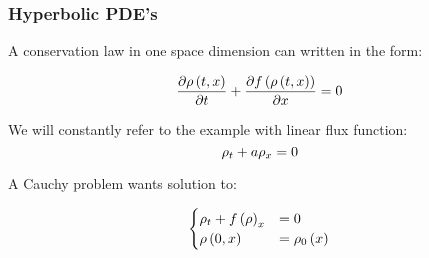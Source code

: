 \begin{frame}
\frametitle{Hyperbolic PDE's}
A conservation law in one space dimension can written in the form:


\begin{equation}
\frac{\partial\rho\left(t,x\right)}{\partial t}+\frac{\partial f\left(\rho\left(t,x\right)\right)}{\partial x}=0
\end{equation}


\begin{example}
We will constantly refer to the example with linear flux function:
\begin{equation}
\rho_{t}+a\rho_x  =0
\end{equation}
\end{example}

A Cauchy problem wants solution to:

\begin{equation}
\begin{cases}
\rho_{t}+f\left(\rho\right)_{x} & =0\\
\rho\left(0,x\right) & =\rho_{0}\left(x\right)
\end{cases}
\end{equation}
\end{frame}